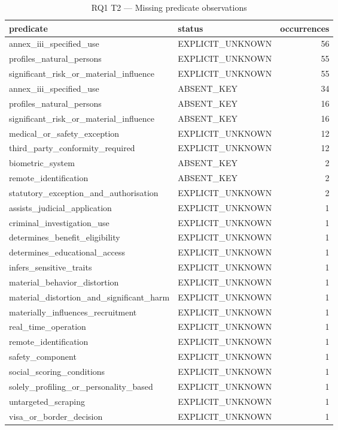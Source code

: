 \begin{table}
\caption{RQ1 T2 — Missing predicate observations}
\label{tab:rq1_t2_missing_predicate_frequency}
\begin{tabular}{llr}
\toprule
predicate & status & occurrences \\
\midrule
annex\_iii\_specified\_use & EXPLICIT\_UNKNOWN & 56 \\
profiles\_natural\_persons & EXPLICIT\_UNKNOWN & 55 \\
significant\_risk\_or\_material\_influence & EXPLICIT\_UNKNOWN & 55 \\
annex\_iii\_specified\_use & ABSENT\_KEY & 34 \\
profiles\_natural\_persons & ABSENT\_KEY & 16 \\
significant\_risk\_or\_material\_influence & ABSENT\_KEY & 16 \\
medical\_or\_safety\_exception & EXPLICIT\_UNKNOWN & 12 \\
third\_party\_conformity\_required & EXPLICIT\_UNKNOWN & 12 \\
biometric\_system & ABSENT\_KEY & 2 \\
remote\_identification & ABSENT\_KEY & 2 \\
statutory\_exception\_and\_authorisation & EXPLICIT\_UNKNOWN & 2 \\
assists\_judicial\_application & EXPLICIT\_UNKNOWN & 1 \\
criminal\_investigation\_use & EXPLICIT\_UNKNOWN & 1 \\
determines\_benefit\_eligibility & EXPLICIT\_UNKNOWN & 1 \\
determines\_educational\_access & EXPLICIT\_UNKNOWN & 1 \\
infers\_sensitive\_traits & EXPLICIT\_UNKNOWN & 1 \\
material\_behavior\_distortion & EXPLICIT\_UNKNOWN & 1 \\
material\_distortion\_and\_significant\_harm & EXPLICIT\_UNKNOWN & 1 \\
materially\_influences\_recruitment & EXPLICIT\_UNKNOWN & 1 \\
real\_time\_operation & EXPLICIT\_UNKNOWN & 1 \\
remote\_identification & EXPLICIT\_UNKNOWN & 1 \\
safety\_component & EXPLICIT\_UNKNOWN & 1 \\
social\_scoring\_conditions & EXPLICIT\_UNKNOWN & 1 \\
solely\_profiling\_or\_personality\_based & EXPLICIT\_UNKNOWN & 1 \\
untargeted\_scraping & EXPLICIT\_UNKNOWN & 1 \\
visa\_or\_border\_decision & EXPLICIT\_UNKNOWN & 1 \\
\bottomrule
\end{tabular}
\end{table}
